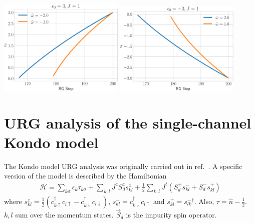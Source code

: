 \begin{center}
	\includegraphics[width=0.45\textwidth]{../figures/zero2.pdf}
	\hspace*{\fill}
	\includegraphics[width=0.45\textwidth]{../figures/zero1.pdf}
	\label{plot2}
\end{center}
\section{URG analysis of the single-channel Kondo model}
\label{kondourg}
The Kondo model URG analysis was originally carried out in ref.~\cite{am_thesis}. A specific version of the model is described by the Hamiltonian
\begin{equation}\begin{aligned}
	\mathcal{H} = \sum_{k\sigma}\epsilon_{k}\tau_{k\sigma} + \sum_{k,l} J^z S_d^z s^z_{kl} + \frac{1}{2}\sum_{k,l} J^t \left(S_d^+ s^-_{kl}  + S_d^- s^+_{kl}\right)
\end{aligned}\end{equation}
where \(s^z_{kl} = \frac{1}{2}\left(c^\dagger_{k\uparrow}c_{l \uparrow} - c^\dagger_{k\downarrow}c_{l \downarrow}\right)\), \(s^-_{kl} = c^\dagger_{k \downarrow}c_{l \uparrow}\) and \(s^+_{kl} = {s^-_{lk}}^\dagger\). Also, \(\tau = \hat n - \frac{1}{2}\). \(k,l\) sum over the momentum states. \(\vec S_d\) is the impurity spin operator.

